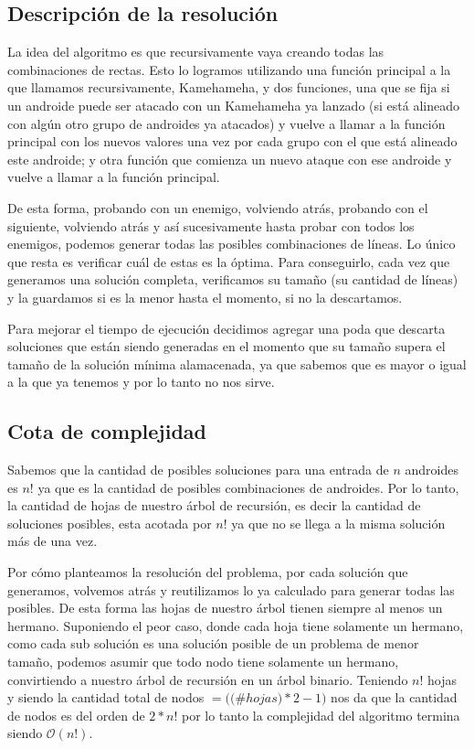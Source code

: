 \documentclass[10pt,a4paper]{article}
\begin{document}
\subsection{Descripción de la resolución}
La idea del algoritmo es que recursivamente vaya creando todas las combinaciones de rectas. Esto lo logramos utilizando una función principal a la que llamamos recursivamente, Kamehameha,  y dos funciones, una que se fija si un androide puede ser atacado con un Kamehameha ya lanzado (si está alineado con algún otro grupo de androides ya atacados) y vuelve a llamar a la función principal con los nuevos valores una vez por cada grupo con el que está alineado este androide; y otra función que comienza un nuevo ataque con ese androide y vuelve a llamar a la función principal.
\par{De esta forma, probando con un enemigo, volviendo atrás, probando con el siguiente, volviendo atrás y así sucesivamente hasta probar con todos los enemigos, podemos generar todas las posibles combinaciones de líneas. Lo único que resta es verificar cuál de estas es la óptima. Para conseguirlo, cada vez que generamos una solución completa, verificamos su tamaño (su cantidad de líneas) y la guardamos si es la menor hasta el momento, si no la descartamos.}
\par{Para mejorar el tiempo de ejecución decidimos agregar una poda que descarta soluciones que están siendo generadas en el momento que su tamaño supera el tamaño de la solución mínima alamacenada, ya que sabemos que es mayor o igual a la que ya tenemos y por lo tanto no nos sirve.}

\subsection{Cota de complejidad}
Sabemos que la cantidad de posibles soluciones para una entrada de $n$ androides es $n!$ ya que es la cantidad de posibles combinaciones de androides. Por lo tanto, la cantidad de hojas de nuestro árbol de recursión, es decir la cantidad de soluciones posibles, esta acotada por $n!$ ya que no se llega a la misma solución más de una vez.

Por cómo planteamos la resolución del problema, por cada solución que generamos, volvemos atrás y reutilizamos lo ya calculado para generar todas las posibles. De esta forma las hojas de nuestro árbol tienen siempre al menos un hermano. Suponiendo el peor caso, donde cada hoja tiene solamente un hermano, como cada sub solución es una solución posible de un problema de menor tamaño, podemos asumir que todo nodo tiene solamente un hermano, convirtiendo a nuestro árbol de recursión en un árbol binario. Teniendo $n!$ hojas y siendo la cantidad total de nodos $= (($\#$hojas)*2 - 1)$ nos da que la cantidad de nodos es del orden de $2*n!$ por lo tanto la complejidad del algoritmo termina siendo $\mathcal{O}(n!)$.
\end{document}
